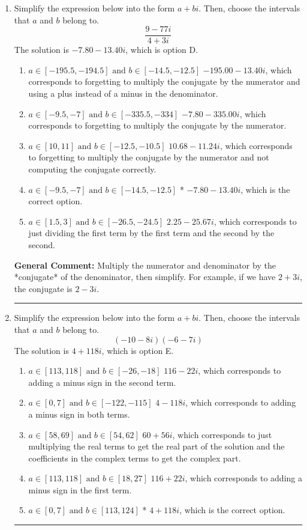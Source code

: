 \documentclass{extbook}[14pt]
\newcommand{\litem}[1]{\item #1

\rule{\textwidth}{0.4pt}}
\begin{document}
\begin{enumerate}\litem{
Simplify the expression below into the form $a+bi$. Then, choose the intervals that $a$ and $b$ belong to.
\[ \frac{9 - 77 i}{4 + 3 i} \]
The solution is \( -7.80  - 13.40 i \), which is option D.\begin{enumerate}[label=\Alph*.]
\item \( a \in [-195.5, -194.5] \text{ and } b \in [-14.5, -12.5] \)
 $-195.00  - 13.40 i$, which corresponds to forgetting to multiply the conjugate by the numerator and using a plus instead of a minus in the denominator.
\item \( a \in [-9.5, -7] \text{ and } b \in [-335.5, -334] \)
 $-7.80  - 335.00 i$, which corresponds to forgetting to multiply the conjugate by the numerator.
\item \( a \in [10, 11] \text{ and } b \in [-12.5, -10.5] \)
 $10.68  - 11.24 i$, which corresponds to forgetting to multiply the conjugate by the numerator and not computing the conjugate correctly.
\item \( a \in [-9.5, -7] \text{ and } b \in [-14.5, -12.5] \)
* $-7.80  - 13.40 i$, which is the correct option.
\item \( a \in [1.5, 3] \text{ and } b \in [-26.5, -24.5] \)
 $2.25  - 25.67 i$, which corresponds to just dividing the first term by the first term and the second by the second.
\end{enumerate}

\textbf{General Comment:} Multiply the numerator and denominator by the *conjugate* of the denominator, then simplify. For example, if we have $2+3i$, the conjugate is $2-3i$.
}
\litem{
Simplify the expression below into the form $a+bi$. Then, choose the intervals that $a$ and $b$ belong to.
\[ (-10 - 8 i)(-6 - 7 i) \]
The solution is \( 4 + 118 i \), which is option E.\begin{enumerate}[label=\Alph*.]
\item \( a \in [113, 118] \text{ and } b \in [-26, -18] \)
 $116 - 22 i$, which corresponds to adding a minus sign in the second term.
\item \( a \in [0, 7] \text{ and } b \in [-122, -115] \)
 $4 - 118 i$, which corresponds to adding a minus sign in both terms.
\item \( a \in [58, 69] \text{ and } b \in [54, 62] \)
 $60 + 56 i$, which corresponds to just multiplying the real terms to get the real part of the solution and the coefficients in the complex terms to get the complex part.
\item \( a \in [113, 118] \text{ and } b \in [18, 27] \)
 $116 + 22 i$, which corresponds to adding a minus sign in the first term.
\item \( a \in [0, 7] \text{ and } b \in [113, 124] \)
* $4 + 118 i$, which is the correct option.
\end{enumerate}

}
\end{enumerate}
\end{document}
